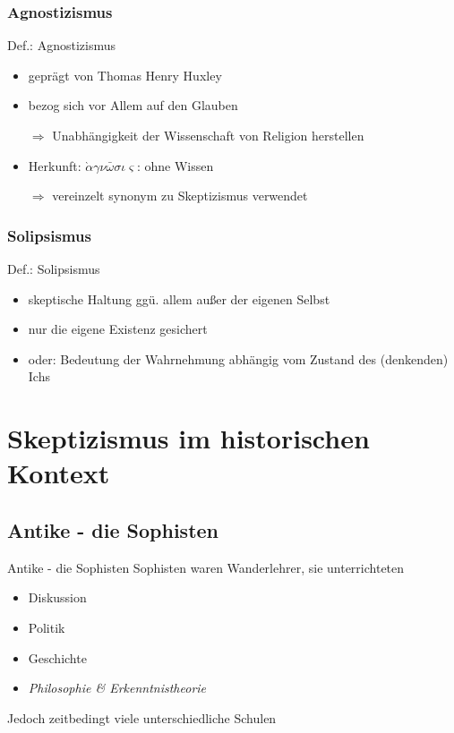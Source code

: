 \documentclass[12pt]{beamer}
\begin{document}
\subsubsection{Agnostizismus}
\begin{frame}{Def.: Agnostizismus}
\begin{itemize}
\item geprägt von Thomas Henry Huxley
\item bezog sich vor Allem auf den Glauben
\item[$\Rightarrow$] Unabhängigkeit der Wissenschaft von Religion herstellen
\item Herkunft: $\grave{\alpha}\gamma\nu\bar{\omega}\sigma\iota\varsigma$: \glqq ohne Wissen\grqq\
\item[$\Rightarrow$] vereinzelt synonym zu Skeptizismus verwendet
\end{itemize}
\end{frame}

\subsubsection{Solipsismus}
\begin{frame}{Def.: Solipsismus}
\begin{itemize}
\item skeptische Haltung ggü. allem außer der eigenen Selbst
\item nur die eigene Existenz gesichert
\item oder: Bedeutung der Wahrnehmung abhängig vom Zustand des (denkenden) Ichs %
\end{itemize}
\end{frame}
\section{Skeptizismus im historischen Kontext}
\subsection{Antike - die Sophisten} %
\begin{frame}{Antike - die Sophisten}
Sophisten waren Wanderlehrer, sie unterrichteten
\begin{itemize}
\item Diskussion
\item Politik
\item Geschichte
\item \emph{Philosophie \& Erkenntnistheorie}
\end{itemize}
Jedoch zeitbedingt viele unterschiedliche Schulen
\end{frame}
\end{document}
